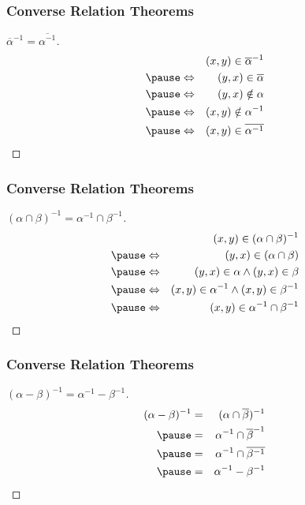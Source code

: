 \documentclass[dvipsnames]{beamer}
\begin{document}
\begin{frame}
  \frametitle{Converse Relation Theorems}

  \begin{proof}[$\overline{\alpha}^{-1} = \overline{\alpha^{-1}}$]
    \begin{eqnarray*}
      &                 & (x,y) \in \overline{\alpha}^{-1}\\\pause
      & \Leftrightarrow & (y,x) \in \overline{\alpha}\\\pause
      & \Leftrightarrow & (y,x) \notin \alpha\\\pause
      & \Leftrightarrow & (x,y) \notin \alpha^{-1}\\\pause
      & \Leftrightarrow & (x,y) \in \overline{\alpha^{-1}}
    \end{eqnarray*}
  \end{proof}
\end{frame}

\begin{frame}
  \frametitle{Converse Relation Theorems}

  \begin{proof}[$(\alpha \cap \beta)^{-1} = \alpha^{-1} \cap \beta^{-1}$]
    \begin{eqnarray*}
      &                 & (x,y) \in (\alpha \cap \beta)^{-1}\\\pause
      & \Leftrightarrow & (y,x) \in (\alpha \cap \beta)\\\pause
      & \Leftrightarrow & (y,x) \in \alpha \wedge (y,x) \in \beta\\\pause
      & \Leftrightarrow & (x,y) \in \alpha^{-1}
                   \wedge (x,y) \in \beta^{-1}\\\pause
      & \Leftrightarrow & (x,y) \in \alpha^{-1} \cap \beta^{-1}
    \end{eqnarray*}
  \end{proof}
\end{frame}

\begin{frame}
  \frametitle{Converse Relation Theorems}

  \begin{proof}[$(\alpha - \beta)^{-1} = \alpha^{-1} - \beta^{-1}$]
    \begin{eqnarray*}
      (\alpha - \beta)^{-1} & = & (\alpha \cap \overline{\beta})^{-1}\\\pause
                            & = & \alpha^{-1} \cap \overline{\beta}^{-1}\\\pause
                            & = & \alpha^{-1} \cap \overline{\beta^{-1}}\\\pause
                            & = & \alpha^{-1} - \beta^{-1}
    \end{eqnarray*}
  \end{proof}
\end{frame}
\end{document}
